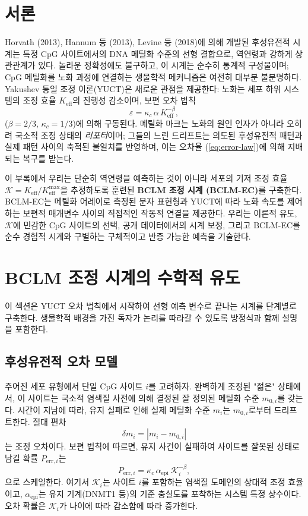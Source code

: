 \documentclass[12pt,a4paper]{article}
\newcommand{\REL}{\mathcal{K}}          %
\begin{document}
	\section{서론}
	\label{sec:intro}
	Horvath (2013), Hannum 등 (2013), Levine 등 (2018)에 의해 개발된 후성유전적 시계는 특정 CpG 사이트에서의 DNA 메틸화 수준의 선형 결합으로, 역연령과 강하게 상관관계가 있다.
	놀라운 정확성에도 불구하고, 이 시계는 순수히 통계적 구성물이며; CpG 메틸화를 노화 과정에 연결하는 생물학적 메커니즘은 여전히 대부분 불분명하다.
	Yakushev 통일 조정 이론(YUCT)은 새로운 관점을 제공한다: 노화는 세포 하위 시스템의 조정 효율 \(K_{\mathrm{eff}}\)의 진행성 감소이며, 보편 오차 법칙
	\begin{equation}
		\varepsilon = \kappa_c \, \alpha \, K_{\mathrm{eff}}^{-\beta},
		\label{eq:error-law}
	\end{equation}
	(\(\beta = 2/3\), \(\kappa_c = 1/3\))에 의해 구동된다.
	메틸화 마크는 노화의 원인 인자가 아니라 오히려 국소적 조정 상태의 \emph{리포터}이며; 그들의 느린 드리프트는 의도된 후성유전적 패턴과 실제 패턴 사이의 축적된 불일치를 반영하며, 이는 오차율 (\ref{eq:error-law})에 의해 지배되는 복구를 받는다.
	
	이 부록에서 우리는 단순히 역연령을 예측하는 것이 아니라 세포의 기저 조정 효율 \(\REL = K_{\mathrm{eff}}/K_{\mathrm{eff}}^{\max}\)을 추정하도록 훈련된 \textbf{BCLM 조정 시계 (BCLM-EC)}를 구축한다.
	BCLM-EC는 메틸화 어레이로 측정된 분자 표현형과 YUCT에 따라 노화 속도를 제어하는 보편적 매개변수 사이의 직접적인 작동적 연결을 제공한다.
	우리는 이론적 유도, \(\REL\)에 민감한 CpG 사이트의 선택, 공개 데이터에서의 시계 보정, 그리고 BCLM-EC를 순수 경험적 시계와 구별하는 구체적이고 반증 가능한 예측을 기술한다.
	
	\section{BCLM 조정 시계의 수학적 유도}
	\label{sec:math}
	이 섹션은 YUCT 오차 법칙에서 시작하여 선형 예측 변수로 끝나는 시계를 단계별로 구축한다. 생물학적 배경을 가진 독자가 논리를 따라갈 수 있도록 방정식과 함께 설명을 포함한다.
	
	\subsection{후성유전적 오차 모델}
	주어진 세포 유형에서 단일 CpG 사이트 \(i\)를 고려하자. 완벽하게 조정된 "젊은" 상태에서, 이 사이트는 국소적 염색질 사전에 의해 결정된 잘 정의된 메틸화 수준 \(m_{0,i}\)를 갖는다. 시간이 지남에 따라, 유지 실패로 인해 실제 메틸화 수준 \(m_i\)는 \(m_{0,i}\)로부터 드리프트한다. 절대 편차
	\[
	\delta m_i = |m_i - m_{0,i}|
	\]
	는 조정 오차이다. 보편 법칙에 따르면, 유지 사건이 실패하여 사이트를 잘못된 상태로 남길 확률 \(P_{\mathrm{err},i}\)는
	\begin{equation}
		P_{\mathrm{err},i} = \kappa_c \, \alpha_{\mathrm{epi}} \, \REL_i^{-\beta},
		\label{eq:perr}
	\end{equation}
	으로 스케일한다. 여기서 \(\REL_i\)는 사이트 \(i\)를 포함하는 염색질 도메인의 상대적 조정 효율이고, \(\alpha_{\mathrm{epi}}\)는 유지 기계(DNMT1 등)의 기준 충실도를 포착하는 시스템 특정 상수이다. 오차 확률은 \(\REL_i\)가 나이에 따라 감소함에 따라 증가한다.
	
\end{document}
